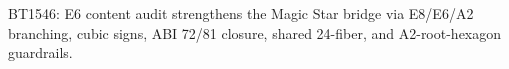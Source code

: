\begin{center}\small
BT1546: E6 content audit strengthens the Magic Star bridge via E8/E6/A2 branching, cubic signs, ABI 72/81 closure, shared 24-fiber, and A2-root-hexagon guardrails.
\end{center}
